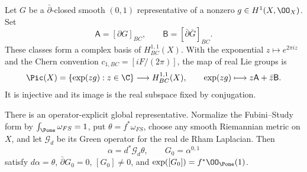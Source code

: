 \begin{proposition}\label{inv:C3.1}
Let $G$ be a $\bar\partial$-closed smooth $(0,1)$ representative of
a nonzero $g\in H^1(X,\OO_X)$.  Set
\[
\mathsf A=[\partial G]_{BC},\qquad
\mathsf B=[\bar\partial\bar G]_{BC}.
\]
These classes form a complex basis of $H^{1,1}_{BC}(X)$.
With the exponential $z\mapsto e^{2\pi iz}$ and the Chern convention
$c_{1,BC}=[iF/(2\pi)]$, the map of real Lie groups is
\begin{equation}\label{inv:eq:C-Pic-map}
\Pic(X)=\{\exp(zg):z\in\C\}\longrightarrow H^{1,1}_{BC}(X),
\qquad \exp(zg)\longmapsto z\mathsf A+\bar z\mathsf B.
\end{equation}
It is injective and its image is the real subspace fixed by conjugation.

There is an operator-explicit global representative.  Normalize the
Fubini--Study form by $\int_{\Pone}\omega_{FS}=1$, put
$\theta=f^*\omega_{FS}$, choose any smooth Riemannian metric on $X$,
and let $\mathcal G_d$ be its Green operator for the real de Rham
Laplacian.  Then
\begin{equation}\label{inv:eq:C-G-Green}
\alpha=d^*\mathcal G_d\theta,\qquad G_0=\alpha^{0,1}
\end{equation}
satisfy $d\alpha=\theta$, $\bar\partial G_0=0$,
$[G_0]\ne0$, and $\exp([G_0])=f^*\OO_{\Pone}(1)$.
\end{proposition}
